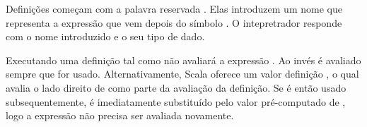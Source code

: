 Defini\c{c}\~{o}es come\c{c}am com a palavra reservada . Elas introduzem um nome
que representa a express\~{a}o que vem depois do s\'{i}mbolo \code{=}. O intepretrador
responde com o nome introduzido e o seu tipo de dado.



Executando uma defini\c{c}\~{a}o tal como  n\~{a}o avaliar\'{a} a express\~{a}o . 
Ao inv\'{e}s  \'{e} avaliado sempre que  for usado. Alternativamente, Scala 
oferece um valor defini\c{c}\~{a}o , o qual avalia o lado direito de 
como parte da avalia\c{c}\~{a}o da defini\c{c}\~{a}o. Se  \'{e} ent\~{a}o usado subsequentemente, \'{e} 
imediatamente substitu\'{i}do pelo valor pr\'{e}-computado de , logo a express\~{a}o n\~{a}o 
precisa ser avaliada novamente.

